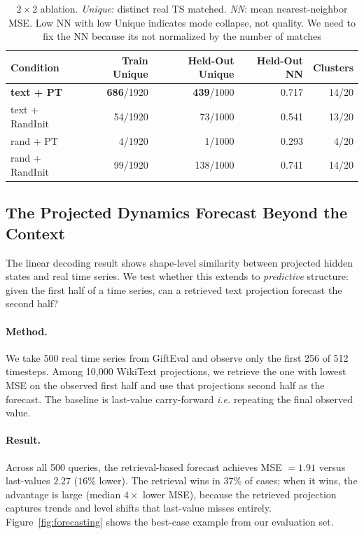 \begin{table}[h]
\centering
\caption{$2\times 2$ ablation. \emph{Unique}: distinct real TS matched. \emph{NN}: mean nearest-neighbor MSE. Low NN with low Unique indicates mode collapse, not quality. We need to fix the NN because its not normalized by the number of matches}
\label{tab:ablation}
\begin{tabular}{lrrrr}
\toprule
Condition & Train Unique & Held-Out Unique & Held-Out NN & Clusters \\
\midrule
\textbf{text + PT}   & \textbf{686}/1920 & \textbf{439}/1000 & 0.717 & 14/20 \\
text + RandInit       & 54/1920           & 73/1000            & 0.541 & 13/20 \\
rand + PT             & 4/1920            & 1/1000             & 0.293 & 4/20  \\
rand + RandInit       & 99/1920           & 138/1000           & 0.741 & 14/20 \\
\bottomrule
\end{tabular}
\end{table}


\subsection{The Projected Dynamics Forecast Beyond the Context}
\label{sec:forecasting}

The linear decoding result shows shape-level similarity between projected hidden states and real time series. We test whether this extends to \emph{predictive} structure: given the first half of a time series, can a retrieved text projection forecast the second half?

\paragraph{Method.} We take 500 real time series from GiftEval and observe only the first 256 of 512 timesteps. Among 10{,}000 WikiText projections, we retrieve the one with lowest MSE on the observed first half and use that projections second half as the forecast. The baseline is last-value carry-forward \textit{i.e.} repeating the final observed value.

\paragraph{Result.} Across all 500 queries, the retrieval-based forecast achieves MSE $= 1.91$ versus last-values $2.27$ ($16\%$ lower). The retrieval wins in $37\%$ of cases; when it wins, the advantage is large (median $4\times$ lower MSE), because the retrieved projection captures trends and level shifts that last-value misses entirely. Figure~\ref{fig:forecasting} shows the best-case example from our evaluation set.

